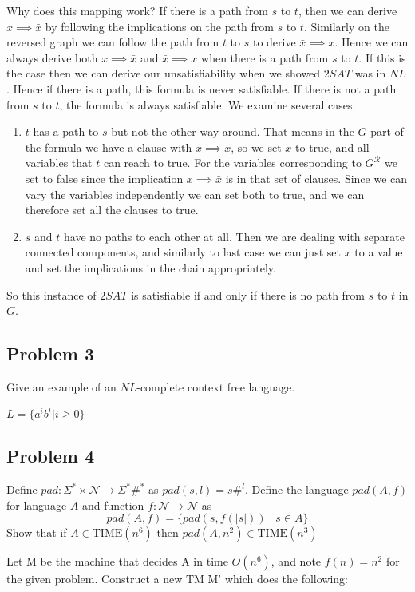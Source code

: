 \documentclass[english]{article}
\begin{document}
Why does this mapping work? 
If there is a path from $s$ to $t$, then we can derive $x \implies \bar{x}$ by following the implications on the path
from $s$ to $t$. Similarly on the reversed graph we can follow the path from $t$ to $s$ to derive
$\bar{x} \implies x$. Hence we can always derive both $x \implies \bar{x}$ and $\bar{x} \implies x$ when there is a
path from $s$ to $t$. If this is the case then we can derive our unsatisfiability when we showed $2SAT$ was in $NL$.
Hence if there is a path, this formula is never satisfiable. If there is not a path from $s$ to $t$, the formula is
always satisfiable. We examine several cases:
\begin{enumerate}
\item $t$ has a path to $s$ but not the other way around. That means in the $G$ part of the formula we have a clause
  with $\bar{x} \implies x$, so we set $x$ to true, and all variables that $t$ can reach to true. For the variables
  corresponding to $G^\mathcal{R}$ we set to false since the implication $x \implies \bar{x}$ is in that set of
  clauses. Since we can vary the variables independently we can set both to true, and we can therefore set all the 
  clauses to true. 
\item $s$ and $t$ have no paths to each other at all. Then we are dealing with separate connected components, and 
  similarly to last case we can just set $x$ to a value and set the implications in the chain appropriately. 
\end{enumerate}
So this instance of $2SAT$ is satisfiable if and only if there is no path from $s$ to $t$ in $G$. 

\subsection*{Problem 3}
Give an example of an $NL$-complete context free language.

$L = \{a^ib^i | i \ge 0\}$

\subsection*{Problem 4}
Define $pad : \Sigma^* \times \mathcal{N} \rightarrow \Sigma^*\#^*$ as $pad(s,l) = s\#^l$. Define
the language $pad(A,f)$ for language $A$ and function $f : \mathcal{N} \rightarrow \mathcal{N}$ as
\[ pad(A,f) = \{ pad(s,f(|s|)) \mid s \in A \} \]
Show that if $A \in \textrm{TIME}(n^6)$ then $pad(A,n^2) \in \textrm{TIME}(n^3)$

Let M be the machine that decides A in time $O(n^6)$, and note $f(n) = n^2$ for the given problem. Construct a new TM M' which does the following:
\end{document}
